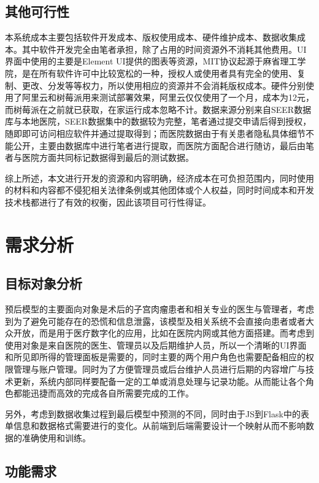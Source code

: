 \subsection{其他可行性}

本系统成本主要包括软件开发成本、版权使用成本、硬件维护成本、数据收集成本。其中软件开发完全由笔者承担，除了占用的时间资源外不消耗其他费用。UI界面中使用的主要是Element UI提供的图表等资源，MIT协议起源于麻省理工学院，是在所有软件许可中比较宽松的一种，授权人或使用者具有完全的使用、复制、更改、分发等等权力，所以使用相应的资源并不会消耗版权成本。硬件分别使用了阿里云和树莓派用来测试部署效果，阿里云仅仅使用了一个月，成本为12元，而树莓派在之前就已获取，在家运行成本忽略不计。数据来源分别来自SEER数据库与本地医院，SEER数据集中的数据较为完整，笔者通过提交申请后得到授权，随即即可访问相应软件并通过提取得到；而医院数据由于有关患者隐私具体细节不能公开，主要由数据库中进行笔者进行提取，而医院方面配合进行随访，最后由笔者与医院方面共同标记数据得到最后的测试数据。

综上所述，本文进行开发的资源和内容明确，经济成本在可负担范围内，同时使用的材料和内容都不侵犯相关法律条例或其他团体或个人权益，同时时间成本和开发技术栈都进行了有效的权衡，因此该项目可行性得证。

\section{需求分析}

\subsection{目标对象分析}

预后模型的主要面向对象是术后的子宫肉瘤患者和相关专业的医生与管理者，考虑到为了避免可能存在的恐慌和信息泄露，该模型及相关系统不会直接向患者或者大众开放，而是用于医疗数字化的应用，比如在医院内网或其他方面搭建。而考虑到使用对象是来自医院的医生、管理员以及后期维护人员，所以一个清晰的UI界面和所见即所得的管理面板是需要的，同时主要的两个用户角色也需要配备相应的权限管理与账户管理。同时为了方便管理员或后台维护人员进行后期的内容增广与技术更新，系统内部同样要配备一定的工单或消息处理与记录功能。从而能让各个角色都能迅捷而高效的完成各自所需要完成的工作。

另外，考虑到数据收集过程到最后模型中预测的不同，同时由于JS到Flask中的表单信息和数据格式需要进行的变化。从前端到后端需要设计一个映射从而不影响数据的准确使用和训练。

\subsection{功能需求}

